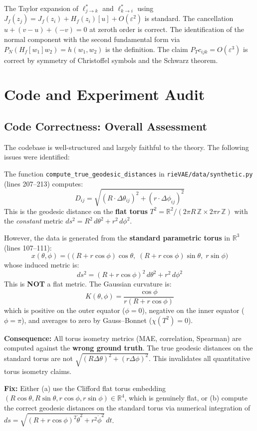 \documentclass{article}
\begin{document}
The Taylor expansion of $\ell^*_{j \to k}$ and $\ell^*_{k \to i}$ using
$J_f(z_j) = J_f(z_i) + H_f(z_i)[u] + O(\varepsilon^2)$ is standard.
The cancellation $u + (v-u) + (-v) = 0$ at zeroth order is correct.
The identification of the normal component with the second fundamental form
via $P_N(H_f[w_1]w_2) = h(w_1, w_2)$ is the definition.
The claim $P_T c_{ijk} = O(\varepsilon^3)$ is correct by symmetry of
Christoffel symbols and the Schwarz theorem.

\section{Code and Experiment Audit}
\label{sec:code_audit}

\subsection{Code Correctness: Overall Assessment}

The codebase is well-structured and largely faithful to the theory.
The following issues were identified:

\begin{bugbox}
\label{bug:torus_geodesic}
The function \texttt{compute\_true\_geodesic\_distances} in
\texttt{rieVAE/data/synthetic.py} (lines 207--213) computes:
\[
  D_{ij} = \sqrt{(R \cdot \Delta\theta_{ij})^2 + (r \cdot \Delta\phi_{ij})^2}
\]
This is the geodesic distance on the \textbf{flat torus}
$T^2 = \mathbb{R}^2 / (2\pi R\,\mathbb{Z} \times 2\pi r\,\mathbb{Z})$
with the \textit{constant} metric $ds^2 = R^2\,d\theta^2 + r^2\,d\phi^2$.

However, the data is generated from the \textbf{standard parametric torus} in
$\mathbb{R}^3$ (lines 107--111):
\[
  x(\theta,\phi) = \bigl((R + r\cos\phi)\cos\theta,\;
  (R + r\cos\phi)\sin\theta,\; r\sin\phi\bigr)
\]
whose induced metric is:
\[
  ds^2 = (R + r\cos\phi)^2\,d\theta^2 + r^2\,d\phi^2
\]
This is \textbf{NOT} a flat metric. The Gaussian curvature is:
\[
  K(\theta, \phi) = \frac{\cos\phi}{r(R + r\cos\phi)}
\]
which is positive on the outer equator ($\phi = 0$), negative on the inner
equator ($\phi = \pi$), and averages to zero by Gauss--Bonnet
($\chi(T^2) = 0$).

\textbf{Consequence:} All torus isometry metrics (MAE, correlation, Spearman)
are computed against the \textbf{wrong ground truth}. The true geodesic
distances on the standard torus are not $\sqrt{(R\Delta\theta)^2 + (r\Delta\phi)^2}$.
This invalidates all quantitative torus isometry claims.

\textbf{Fix:} Either (a) use the Clifford flat torus embedding
$(R\cos\theta, R\sin\theta, r\cos\phi, r\sin\phi) \in \mathbb{R}^4$, which is
genuinely flat, or (b) compute the correct geodesic distances on the standard
torus via numerical integration of $ds = \sqrt{(R+r\cos\phi)^2\dot\theta^2 + r^2\dot\phi^2}\,dt$.
\end{bugbox}
\end{document}
